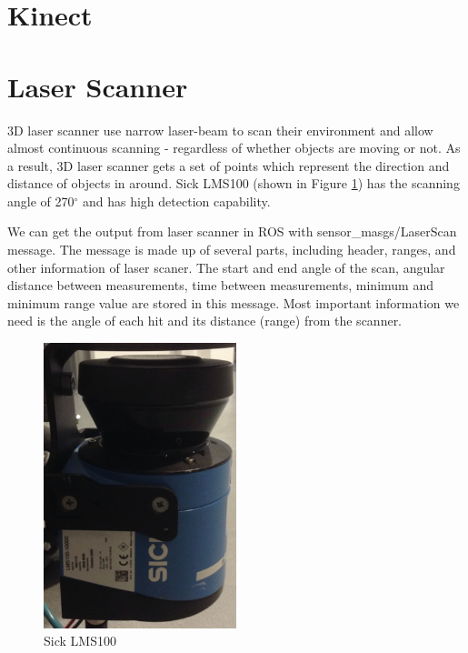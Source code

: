 \section{Kinect}
\section{Laser Scanner}
3D laser scanner use narrow laser-beam to scan their environment and allow almost continuous scanning - regardless of whether objects are moving or not. As a result, 3D laser scanner gets a set of points which represent the direction and distance of objects in around. Sick LMS100 (shown in Figure \ref{Laser}) has the scanning angle of  270$^\circ$ and has high detection capability.

We can get the output from laser scanner in ROS with sensor\_masgs/LaserScan message. The message is made up of several parts, including header, ranges, and other information of laser scaner. The start and end angle of the scan, angular distance between measurements, time between measurements, minimum and minimum range value are stored in this message. Most important information we need is the angle of each hit and its distance (range) from the scanner.

\begin{figure}[thpb]
      \centering
      \includegraphics[width=0.5\textwidth]{graphics/Laserscanner.png}
      \caption{Sick LMS100}
      \label{Laser}
   \end{figure}
